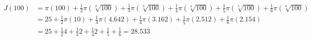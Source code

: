 \begin{equation}\begin{split}
	J(100) &= \pi(100) + \frac{1}{2}\pi(\sqrt[2]{100}) + \frac{1}{3}\pi(\sqrt[3]{100}) + \frac{1}{4}\pi(\sqrt[4]{100})+ \frac{1}{5}\pi(\sqrt[5]{100}) + \frac{1}{6}\pi(\sqrt[6]{100}) \\
	&=25 + \frac{1}{2}\pi(10) + \frac{1}{3}\pi(4.642) + \frac{1}{4}\pi(3.162) + \frac{1}{5}\pi(2.512) + \frac{1}{6}\pi(2.154) \\
	&=25 + \frac{1}{2}4 + \frac{1}{3}2 + \frac{1}{4}2 + \frac{1}{5} + \frac{1}{6} = 28.53\bar{3}
\end{split}
\end{equation}

